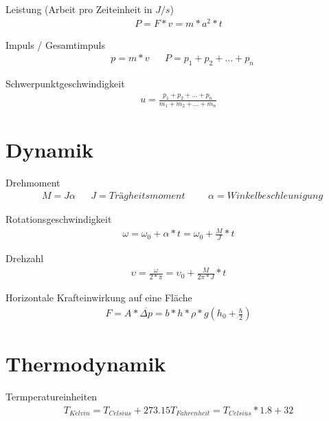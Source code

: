 \documentclass[17pt]{extarticle}
\begin{document}
	Leistung \small(Arbeit pro Zeiteinheit in $J/s$)
	\begin{align}
		P = F * v = m * a^{2} * t
	\end{align}
	
	Impuls / Gesamtimpuls
	\begin{align}
		&p = m * v
		&&P = p_{1} + p_{2} + ... + p_{n}
	\end{align}
	
	Schwerpunktgeschwindigkeit
	\begin{align}
		u = \frac{p_{1} + p_{2} + ... + p_{n}}{m_{1} + m_{2} + ... + m_{n}}
	\end{align}
	
\section{Dynamik}
	Drehmoment
	\begin{align}
		&M = J \alpha
		&&J = Trägheitsmoment
		&&&\alpha = Winkelbeschleunigung
	\end{align}
	
	Rotationsgeschwindigkeit
	\begin{align}
		\omega = \omega_{0} + \alpha * t = \omega_{0} + \frac{M}{J} * t
	\end{align}
	
	Drehzahl
	\begin{align}
		\upsilon = \frac{\omega}{2 * \pi} = \upsilon_{0} + \frac{M}{2\pi * J} * t 
	\end{align}

	Horizontale Krafteinwirkung auf eine Fläche
	\begin{align}
		F = A * \overline{\Delta p} = b*h * \rho*g (h_{0} + \frac{h}{2})
	\end{align}
	
	
\section{Thermodynamik}
	Termperatureinheiten
	\begin{align}
		T_{Kelvin} = T_{Celsius} + 273.15
		T_{Fahrenheit} = T_{Celsius} * 1.8 + 32
	\end{align}
\end{document}
